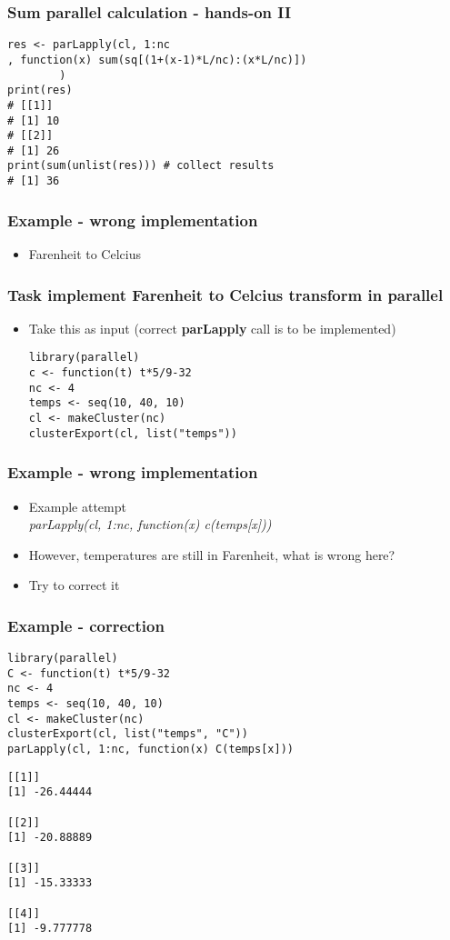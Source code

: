 \documentclass[bigger]{beamer}
\begin{document}
\begin{frame}[fragile]
\frametitle{Sum parallel calculation - hands-on II}
\label{sec-3-6}


\begin{verbatim}
res <- parLapply(cl, 1:nc
, function(x) sum(sq[(1+(x-1)*L/nc):(x*L/nc)])
        )
print(res)
# [[1]]
# [1] 10
# [[2]]
# [1] 26
print(sum(unlist(res))) # collect results
# [1] 36
\end{verbatim}
\end{frame}
\begin{frame}
\frametitle{Example - wrong implementation}
\label{sec-3-7}
\begin{itemize}

\item Farenheit to Celcius
\label{sec-3-7-1}%
\end{itemize} %
\end{frame}
\begin{frame}[fragile]
\frametitle{Task implement Farenheit to Celcius transform in parallel}
\label{sec-3-8}
\begin{itemize}

\item Take this as input (correct \textbf{parLapply} call is to be implemented)\\
\label{sec-3-8-1}%
\begin{verbatim}
library(parallel)
c <- function(t) t*5/9-32
nc <- 4
temps <- seq(10, 40, 10)
cl <- makeCluster(nc)
clusterExport(cl, list("temps"))
\end{verbatim}
\end{itemize} %
\end{frame}
\begin{frame}
\frametitle{Example - wrong implementation}
\label{sec-3-9}
\begin{itemize}

\item Example attempt\\
\label{sec-3-9-1}%
\emph{parLapply(cl, 1:nc, function(x) c(temps[x]))}

\item However, temperatures are still in Farenheit, what is wrong here?
\label{sec-3-9-2}%

\item Try to correct it
\label{sec-3-9-3}%
\end{itemize} %
\end{frame}
\begin{frame}[fragile]
\frametitle{Example - correction}
\label{sec-3-10}


\begin{verbatim}
library(parallel)
C <- function(t) t*5/9-32
nc <- 4
temps <- seq(10, 40, 10)
cl <- makeCluster(nc)
clusterExport(cl, list("temps", "C"))
parLapply(cl, 1:nc, function(x) C(temps[x]))
\end{verbatim}


\begin{verbatim}
[[1]]
[1] -26.44444

[[2]]
[1] -20.88889

[[3]]
[1] -15.33333

[[4]]
[1] -9.777778
\end{verbatim}
\end{frame}
\end{document}
